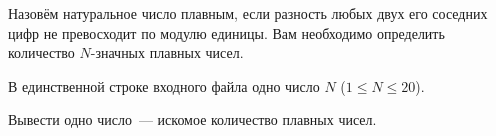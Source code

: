 

Назовём натуральное число плавным, если разность любых двух его соседних цифр 
не превосходит по модулю единицы. Вам необходимо определить количество $N$-значных 
плавных чисел.

\InputFile
В единственной строке входного файла одно число $N$ ($1 \leqslant N \leqslant 20$).

\OutputFile
Вывести одно число~--- искомое количество плавных чисел.


